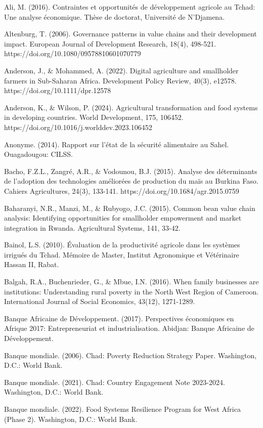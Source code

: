 \documentclass[12pt,oneside]{report}
\begin{document}
Ali, M. (2016). Contraintes et opportunités de développement agricole au Tchad: Une analyse économique. Thèse de doctorat, Université de N'Djamena.

Altenburg, T. (2006). Governance patterns in value chains and their development impact. European Journal of Development Research, 18(4), 498-521. https://doi.org/10.1080/09578810601070779

Anderson, J., \& Mohammed, A. (2022). Digital agriculture and smallholder farmers in Sub-Saharan Africa. Development Policy Review, 40(3), e12578. https://doi.org/10.1111/dpr.12578

Anderson, K., \& Wilson, P. (2024). Agricultural transformation and food systems in developing countries. World Development, 175, 106452. https://doi.org/10.1016/j.worlddev.2023.106452

Anonyme. (2014). Rapport sur l'état de la sécurité alimentaire au Sahel. Ouagadougou: CILSS.

Bacho, F.Z.L., Zangré, A.R., \& Vodounou, B.J. (2015). Analyse des déterminants de l'adoption des technologies améliorées de production du maïs au Burkina Faso. Cahiers Agricultures, 24(3), 133-141. https://doi.org/10.1684/agr.2015.0759

Baharanyi, N.R., Manzi, M., \& Rubyogo, J.C. (2015). Common bean value chain analysis: Identifying opportunities for smallholder empowerment and market integration in Rwanda. Agricultural Systems, 141, 33-42.

Bainol, L.S. (2010). Évaluation de la productivité agricole dans les systèmes irrigués du Tchad. Mémoire de Master, Institut Agronomique et Vétérinaire Hassan II, Rabat.

Balgah, R.A., Buchenrieder, G., \& Mbue, I.N. (2016). When family businesses are institutions: Understanding rural poverty in the North West Region of Cameroon. International Journal of Social Economics, 43(12), 1271-1289.

Banque Africaine de Développement. (2017). Perspectives économiques en Afrique 2017: Entrepreneuriat et industrialisation. Abidjan: Banque Africaine de Développement.

Banque mondiale. (2006). Chad: Poverty Reduction Strategy Paper. Washington, D.C.: World Bank.

Banque mondiale. (2021). Chad: Country Engagement Note 2023-2024. Washington, D.C.: World Bank.

Banque mondiale. (2022). Food Systems Resilience Program for West Africa (Phase 2). Washington, D.C.: World Bank.
\end{document}
